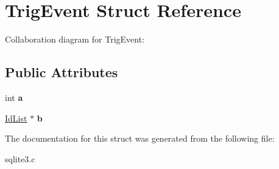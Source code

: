 \hypertarget{structTrigEvent}{}\section{Trig\+Event Struct Reference}
\label{structTrigEvent}


Collaboration diagram for Trig\+Event\+:
\subsection*{Public Attributes}
\begin{DoxyCompactItemize}
\item 
int {\bfseries a}\hypertarget{structTrigEvent_a19ac5a5e59e08350f72ec49cf8fccbb6}{}\label{structTrigEvent_a19ac5a5e59e08350f72ec49cf8fccbb6}

\item 
\hyperlink{structIdList}{Id\+List} $\ast$ {\bfseries b}\hypertarget{structTrigEvent_a86ef160cde95382e98b7934614e7f79f}{}\label{structTrigEvent_a86ef160cde95382e98b7934614e7f79f}

\end{DoxyCompactItemize}


The documentation for this struct was generated from the following file\+:\begin{DoxyCompactItemize}
\item 
sqlite3.\+c\end{DoxyCompactItemize}
